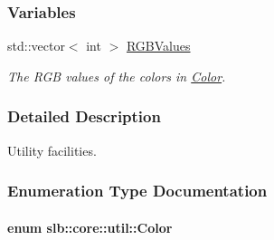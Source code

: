 \subsubsection*{Variables}
\begin{DoxyCompactItemize}
\item 
std\+::vector$<$ int $>$ \hyperlink{namespaceslb_1_1core_1_1util_a5f4cfdcebbe811ab08a9bab966f79f18}{R\+G\+B\+Values}\hypertarget{namespaceslb_1_1core_1_1util_a5f4cfdcebbe811ab08a9bab966f79f18}{}\label{namespaceslb_1_1core_1_1util_a5f4cfdcebbe811ab08a9bab966f79f18}

\begin{DoxyCompactList}\small\item\em The R\+GB values of the colors in \hyperlink{namespaceslb_1_1core_1_1util_afae144e1a65658559242f5cf4fce426f}{Color}. \end{DoxyCompactList}\end{DoxyCompactItemize}


\subsubsection{Detailed Description}
Utility facilities. 

\subsubsection{Enumeration Type Documentation}
\paragraph[{\texorpdfstring{Color}{Color}}]{\setlength{\rightskip}{0pt plus 5cm}enum {\bf slb\+::core\+::util\+::\+Color}\hspace{0.3cm}{\ttfamily [strong]}}\hypertarget{namespaceslb_1_1core_1_1util_afae144e1a65658559242f5cf4fce426f}{}\label{namespaceslb_1_1core_1_1util_afae144e1a65658559242f5cf4fce426f}


